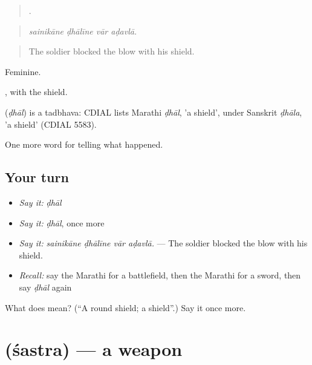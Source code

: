 \begin{quote}
   .
\end{quote}

\begin{quote}
\emph{sainikāne ḍhālīne vār aḍavlā.}
\end{quote}

\begin{quote}
The soldier blocked the blow with his shield.
\end{quote}

Feminine.

, with the shield.

\begin{cousinweb}
\textbf{} (\emph{ḍhāl}) is a tadbhava: CDIAL lists Marathi \emph{ḍhāl}, 'a shield', under Sanskrit \emph{ḍhāla}, 'a shield' (CDIAL 5583).
\end{cousinweb}

\begin{grammarlens}[title={What you've built}]
One more word for telling what happened.
\end{grammarlens}

\subsection*{Your turn}
\begin{itemize}
\raggedright
  \item \emph{Say it:} \emph{ḍhāl}
  \item \emph{Say it:} \emph{ḍhāl}, once more
  \item \emph{Say it:} \emph{sainikāne ḍhālīne vār aḍavlā.} — The soldier blocked the blow with his shield.
  \item \emph{Recall:} say the Marathi for a battlefield, then the Marathi for a sword, then say \emph{ḍhāl} again
\end{itemize}

\begin{tcolorbox}[breakable,colback=teal!4,colframe=teal!35!black,title={Before you move on}]
What does  mean? (\textquotedblleft{}A round shield; a shield\textquotedblright{}.) Say it once more.
\end{tcolorbox}
\section[\texorpdfstring{\mr{शस्त्र} (śastra)}{शस्त्र (śastra)}]{ (śastra) — a weapon}

